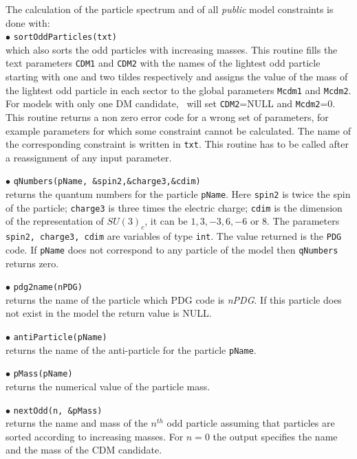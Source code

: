 \documentclass[12pt,a4paper]{article}
\begin{document}
The calculation of the particle spectrum and of all  {\it public} model constraints 
is  done with:\\
\noindent
 $\bullet$ \verb|sortOddParticles(txt)|\\
which also sorts the odd particles with increasing  masses.
This routine  fills the text parameters  \verb|CDM1| and \verb|CDM2| with
the  names of the lightest  odd particle  starting  with one and two tildes respectively and 
assigns  the value of the mass  of
the lightest odd particle in each sector to the global parameters  \verb|Mcdm1| and 
\verb|Mcdm2|.  For models with only one DM candidate, \micro\ will set  \verb|CDM2|=NULL and \verb|Mcdm2|=0. 
This routine returns a non zero error code for a
wrong set of parameters, for example parameters  for which some
constraint cannot be calculated.
The name of the corresponding constraint is
written in \verb|txt|. This routine has to be called after a reassignment of any input parameter.
 

\noindent 
$\bullet$ \verb|qNumbers(pName, &spin2,&charge3,&cdim)|\\
returns the quantum numbers for the particle \verb|pName|. Here \verb|spin2| is twice the spin of the particle; \verb|charge3| is 
three times the electric charge; \verb|cdim| is the  dimension of the representation
of $SU(3)_c$, it can be $1,3,-3,6,-6$ or $8$. The parameters {\tt spin2, charge3, cdim} are 
variables of type {\tt int}. The value returned 
is the {\tt PDG} code. If \verb|pName| does not correspond to any
particle of the model then \verb|qNumbers| returns zero.


\noindent
$\bullet$  \verb|pdg2name(nPDG)| \\
returns  the name of  the particle which PDG code is {\it nPDG}. If this particle does not exist in the model
the return value is NULL.  

\noindent
$\bullet$  \verb|antiParticle(pName)| \\
returns  the name of the anti-particle for the particle \verb|pName|.

\noindent
$\bullet$  \verb|pMass(pName)| \\
returns  the numerical value of the particle mass.


\noindent
$\bullet$  \verb|nextOdd(n, &pMass)| \\
returns the name and mass of the $n^{th}$ odd particle assuming that particles are 
sorted according to increasing masses. For $n=0$ the output specifies the 
name and the mass of the CDM candidate. 
\end{document}
